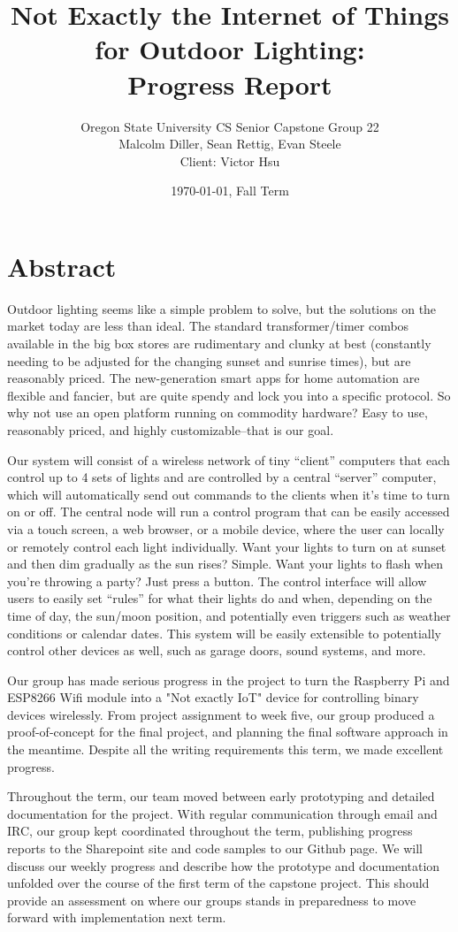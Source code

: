 \documentclass[letterpaper,10pt]{article}
\title{Not Exactly the Internet of Things for Outdoor Lighting:\\Progress Report}
\author{Oregon State University CS Senior Capstone Group 22\\
Malcolm Diller, Sean Rettig, Evan Steele\\
Client: Victor Hsu}
\date{\today, Fall Term}
\begin{document}
\maketitle

\section{Abstract}

Outdoor lighting seems like a simple problem to solve, but the solutions on the
market today are less than ideal.  The standard transformer/timer combos
available in the big box stores are rudimentary and clunky at best (constantly
needing to be adjusted for the changing sunset and sunrise times), but are
reasonably priced. The new-generation smart apps for home automation are
flexible and fancier, but are quite spendy and lock you into a specific
protocol.  So why not use an open platform running on commodity hardware?  Easy
to use, reasonably priced, and highly customizable--that is our goal.

Our system will consist of a wireless network of tiny ``client'' computers that
each control up to 4 sets of lights and are controlled by a central ``server''
computer, which will automatically send out commands to the clients when it's
time to turn on or off.  The central node will run a control program that can 
be easily accessed via a touch screen, a web browser, or a mobile device, where
the user can locally or remotely control each light individually.  Want your
lights to turn on at sunset and then dim gradually as the sun rises?  Simple.
Want your lights to flash when you're throwing a party?  Just press a button.
The control interface will allow users to easily set ``rules'' for what their
lights do and when, depending on the time of day, the sun/moon position, and 
potentially even triggers such as weather conditions or calendar dates.  This
system will be easily extensible to potentially control other devices as well,
such as garage doors, sound systems, and more.

Our group has made serious progress in the project to turn the Raspberry Pi and
ESP8266 Wifi module into a "Not exactly IoT" device for controlling binary
devices wirelessly. From project assignment to week five, our group produced a
proof-of-concept for the final project, and planning the final software
approach in the meantime. Despite all the writing requirements this term, we
made excellent progress.

Throughout the term, our team moved between early prototyping and detailed
documentation for the project. With regular communication through email and
IRC, our group kept coordinated throughout the term, publishing progress
reports to the Sharepoint site and code samples to our Github page. We will
discuss our weekly progress and describe how the prototype and documentation
unfolded over the course of the first term of the capstone project. This should
provide an assessment on where our groups stands in preparedness to move
forward with implementation next term.
\end{document}
